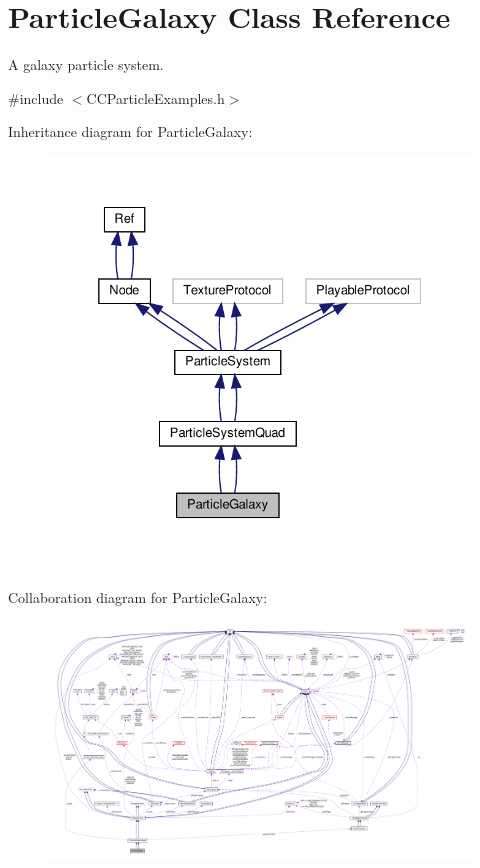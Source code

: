 \hypertarget{classParticleGalaxy}{}\section{Particle\+Galaxy Class Reference}
\label{classParticleGalaxy}


A galaxy particle system.  




{\ttfamily \#include $<$C\+C\+Particle\+Examples.\+h$>$}



Inheritance diagram for Particle\+Galaxy\+:
\nopagebreak
\begin{figure}[H]
\begin{center}
\leavevmode
\includegraphics[width=332pt]{classParticleGalaxy__inherit__graph}
\end{center}
\end{figure}


Collaboration diagram for Particle\+Galaxy\+:
\nopagebreak
\begin{figure}[H]
\begin{center}
\leavevmode
\includegraphics[width=350pt]{classParticleGalaxy__coll__graph}
\end{center}
\end{figure}
